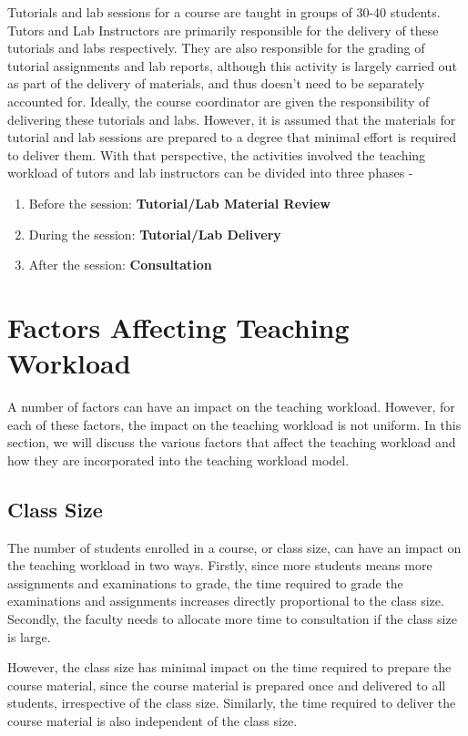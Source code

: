 Tutorials and lab sessions for a course are taught in groups of 30-40 students. Tutors and Lab Instructors are primarily responsible for the delivery of these tutorials and labs respectively. They are also responsible for the grading of tutorial assignments and lab reports, although this activity is largely carried out as part of the delivery of materials, and thus doesn't need to be separately accounted for. Ideally, the course coordinator are given the responsibility of delivering these tutorials and labs. However, it is assumed that the materials for tutorial and lab sessions are prepared to a degree that minimal effort is required to deliver them. With that perspective, the activities involved the teaching workload of tutors and lab instructors can be divided into three phases -

\begin{enumerate}
  \item Before the session: \textbf{Tutorial/Lab Material Review}
  \item During the session: \textbf{Tutorial/Lab Delivery}
  \item After the session: \textbf{Consultation}
\end{enumerate}


\section{Factors Affecting Teaching Workload}

A number of factors can have an impact on the teaching workload. However, for each of these factors, the impact on the teaching workload is not uniform. In this section, we will discuss the various factors that affect the teaching workload and how they are incorporated into the teaching workload model.

\subsection{Class Size}

The number of students enrolled in a course, or class size, can have an impact on the teaching workload in two ways. Firstly, since more students means more assignments and examinations to grade, the time required to grade the examinations and assignments increases directly proportional to the class size. Secondly, the faculty needs to allocate more time to consultation if the class size is large.

However, the class size has minimal impact on the time required to prepare the course material, since the course material is prepared once and delivered to all students, irrespective of the class size. Similarly, the time required to deliver the course material is also independent of the class size.


